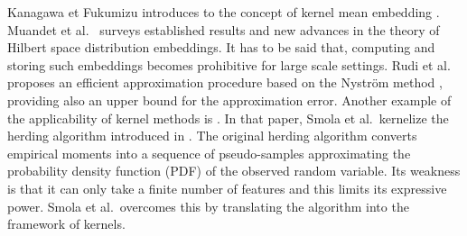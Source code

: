Kanagawa et Fukumizu introduces to the concept of kernel mean embedding \cite{pmlr}. Muandet et al.\ \cite{Muandet_2017} surveys established results and new advances in the theory of Hilbert space distribution embeddings. 
It has to be said that, computing and storing such embeddings becomes prohibitive for large scale settings. Rudi et al.\ \cite{2022nystrom} proposes an efficient approximation procedure based on the Nyström method \cite{nystrom}, providing also an upper bound for the approximation error.
Another example of the applicability of kernel methods is \cite{supersamples}. In that paper, Smola et al.\ kernelize the herding algorithm introduced in \cite{welling2009herding,welling2009herding,Welling2010}. The original herding algorithm converts empirical moments into a sequence of pseudo-samples approximating the probability density function (PDF) of the observed random variable. Its weakness is that it can only take a finite number of features and this limits its expressive power.
Smola et al.\ overcomes this by translating the algorithm into the framework of kernels.


